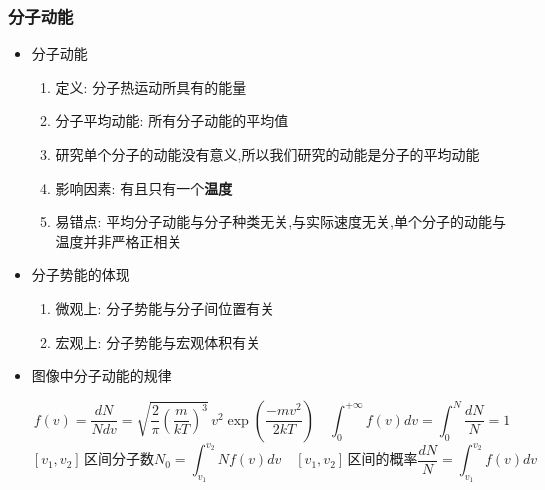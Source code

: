 \documentclass{article}
\begin{document}
\vspace{2em}

\subsubsection{分子动能}
\begin{itemize}
    \item 分子动能
          \begin{enumerate}[label = (\arabic*)]
              \item 定义: 分子热运动所具有的能量
              \item 分子平均动能: 所有分子动能的平均值
              \item 研究单个分子的动能没有意义,所以我们研究的动能是分子的平均动能
              \item 影响因素: 有且只有一个\textbf{温度}
              \item 易错点: 平均分子动能与分子种类无关,与实际速度无关,单个分子的动能与温度并非严格正相关
          \end{enumerate}
    \item 分子势能的体现
          \begin{enumerate}[label = (\arabic*)]
              \item 微观上: 分子势能与分子间位置有关
              \item 宏观上: 分子势能与宏观体积有关
          \end{enumerate}
    \item 图像中分子动能的规律

          \vspace{-1em}
          \begin{adjustbox}{minipage=0.91\linewidth, bgcolor=gray!20, padding=1em}
              \small %
              $$ f(v)= \frac{dN}{Ndv} ={\sqrt {{\frac {2}{\pi }}\left({\frac {m}{kT}}\right)^{3}}}\,v^{2}\exp \left({\frac {-mv^{2}}{2kT}}\right)  \quad
                  \int_{0}^{+\infty} f(v) dv  = \int_{0}^{N} \frac{dN}{N} = 1
              $$
              $$
                  [v_{1},v_{2}] \, \text{区间分子数} N_{0} = \int_{v_{1}}^{v_{2}} N f(v) dv  \quad [v_{1},v_{2}] \, \text{区间的概率} \frac{dN}{N} = \int_{v_{1}}^{v_{2}} f(v) dv
              $$
          \end{adjustbox}
          \vspace{-1em}


\end{itemize}
\end{document}
